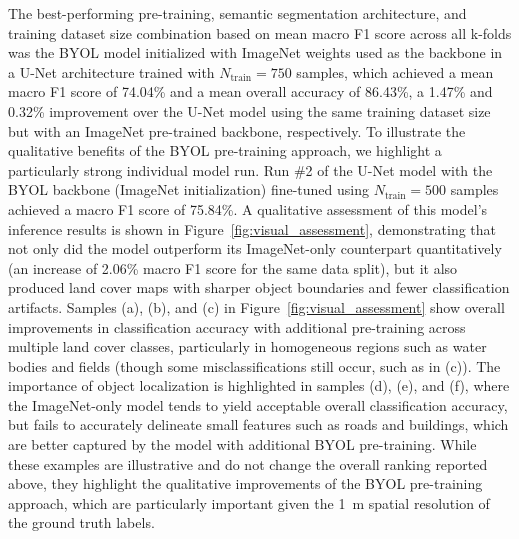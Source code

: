 The best-performing pre-training, semantic segmentation architecture, and training dataset size combination based on mean macro F1 score across all k-folds was the BYOL model initialized with ImageNet weights used as the backbone in a U-Net architecture trained with \(N_\text{train} = 750\) samples, which achieved a mean macro F1 score of \num{74.04}\% and a mean overall accuracy of \num{86.43}\%, a \num{1.47}\% and \num{0.32}\% improvement over the U-Net model using the same training dataset size but with an ImageNet pre-trained backbone, respectively.
To illustrate the qualitative benefits of the BYOL pre-training approach, we highlight a particularly strong individual model run. 
Run \#2 of the U-Net model with the BYOL backbone (ImageNet initialization) fine-tuned using \(N_\text{train} = 500\) samples achieved a macro F1 score of \num{75.84}\%.
A qualitative assessment of this model's inference results is shown in Figure~\ref{fig:visual_assessment}, demonstrating that not only did the model outperform its ImageNet-only counterpart quantitatively (an increase of \num{2.06}\% macro F1 score for the same data split), but it also produced land cover maps with sharper object boundaries and fewer classification artifacts.
Samples (a), (b), and (c) in Figure~\ref{fig:visual_assessment} show overall improvements in classification accuracy with additional pre-training across multiple land cover classes, particularly in homogeneous regions such as water bodies and fields (though some misclassifications still occur, such as in (c)).
The importance of object localization is highlighted in samples (d), (e), and (f), where the ImageNet-only model tends to yield acceptable overall classification accuracy, but fails to accurately delineate small features such as roads and buildings, which are better captured by the model with additional BYOL pre-training.
While these examples are illustrative and do not change the overall ranking reported above, they highlight the qualitative improvements of the BYOL pre-training approach, which are particularly important given the \SI{1}{\meter} spatial resolution of the ground truth labels.



